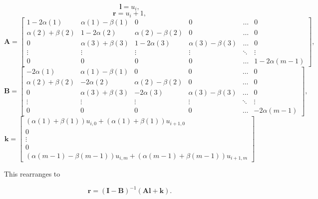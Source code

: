 \documentclass{article}
\begin{document}
\begin{equation}
  \textbf{l} = u_{i},
\end{equation}
\begin{equation}
  \textbf{r} = u_i+1,
\end{equation}
\begin{equation}
  \textbf{A} = \begin{bmatrix}
    1-2\alpha(1) & \alpha(1) - \beta(1) & 0 & 0 & \hdots & 0 \\
    \alpha(2) + \beta(2) & 1-2\alpha(2) & \alpha(2) - \beta(2) & 0 & \hdots & 0 \\
    0 & \alpha(3) + \beta(3) & 1-2\alpha(3) & \alpha(3) - \beta(3) & \hdots & 0 \\
    \vdots & \vdots & \vdots & \vdots & \ddots & \vdots \\
    0 & 0 & 0 & 0 & \hdots & 1-2\alpha(m-1)
  \end{bmatrix},
\end{equation}
\begin{equation}
  \textbf{B} = \begin{bmatrix}
    -2\alpha(1) & \alpha(1) - \beta(1) & 0 & 0 & \hdots & 0 \\
    \alpha(2) + \beta(2) & -2\alpha(2) & \alpha(2) - \beta(2) & 0 & \hdots & 0 \\
    0 & \alpha(3) + \beta(3) & -2\alpha(3) & \alpha(3) - \beta(3) & \hdots & 0 \\
    \vdots & \vdots & \vdots & \vdots & \ddots & \vdots \\
    0 & 0 & 0 & 0 & \hdots & -2\alpha(m-1)
  \end{bmatrix},
\end{equation}
\begin{equation}
  \textbf{k} = \begin{bmatrix}
    (\alpha(1) + \beta(1))u_{i, 0} + (\alpha(1) + \beta(1))u_{i+1, 0} \\
    0 \\
    \vdots \\
    0 \\
    (\alpha(m-1) - \beta(m-1))u_{i, m} + (\alpha(m-1) + \beta(m-1))u_{i+1, m}
  \end{bmatrix}
\end{equation}

This rearranges to

\begin{equation}
  \textbf{r} = (\textbf{I} - \textbf{B})^{-1}(\textbf{Al}+\textbf{k}).
\end{equation}
\end{document}
